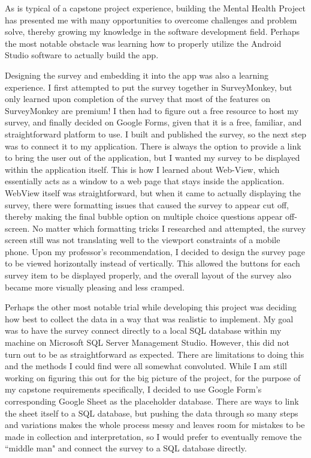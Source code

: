 \documentclass{article}
\begin{document}
As is typical of a capstone project experience, building the Mental Health Project has presented me with many opportunities to overcome challenges and problem solve, thereby growing my knowledge in the software development field.
Perhaps the most notable obstacle was learning how to properly utilize the Android Studio software to actually build the app. 

Designing the survey and embedding it into the app was also a learning experience. I first attempted to put the survey together in SurveyMonkey, but only learned upon completion of the survey that most of the features on SurveyMonkey are premium! I then had to figure out a free resource to host my survey, and finally decided on Google Forms, given that it is a free, familiar, and straightforward platform to use. I built and published the survey, so the next step was to connect it to my application. There is always the option to provide a link to bring the user out of the application, but I wanted my survey to be displayed within the application itself. This is how I learned about Web\allowbreak-View, which essentially acts as a window to a web page that stays inside the application. WebView itself was straightforward, but when it came to actually displaying the survey, there were formatting issues that caused the survey to appear cut off, thereby making the final bubble option on multiple choice questions appear off-screen. No matter which formatting tricks I researched and attempted, the survey screen still was not translating well to the viewport constraints of a mobile phone. Upon my professor's recommendation, I decided to design the survey page to be viewed horizontally instead of vertically\cite{Landscape}. This allowed the buttons for each survey item to be displayed properly, and the overall layout of the survey also became more visually pleasing and less cramped\cite{Resizability}.

Perhaps the other most notable trial while developing this project was deciding how best to collect the data in a way that was realistic to implement. My goal was to have the survey connect directly to a local SQL database within my machine on Microsoft SQL Server Management Studio. However, this did not turn out to be as straightforward as expected. There are limitations to doing this and the methods I could find were all somewhat convoluted. While I am still working on figuring this out for the big picture of the project, for the purpose of my capstone requirements specifically, I decided to use Google Form's corresponding Google Sheet as the placeholder database. There are ways to link the sheet itself to a SQL database, but pushing the data through so many steps and variations makes the whole process messy and leaves room for mistakes to be made in collection and interpretation, so I would prefer to eventually remove the ``middle man" and connect the survey to a SQL database directly.
\end{document}
